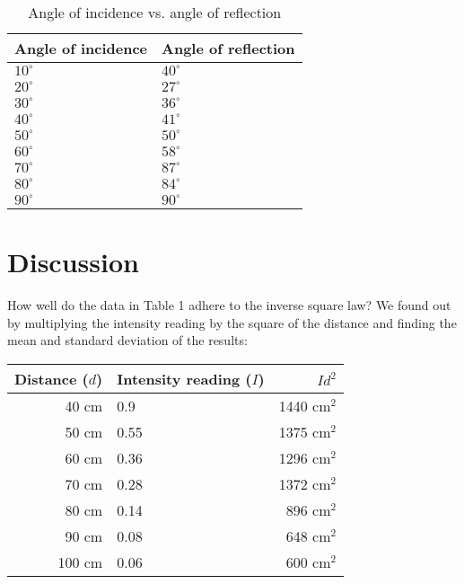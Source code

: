 \documentclass[11pt, titlepage, letterpaper, twoside]{article}
\begin{document}
\begin{table}[h!]
\centering
\caption{Angle of incidence vs. angle of reflection}
\label{angle-of-reflection}
\begin{tabular}{|l|l|}
\hline
Angle of incidence & Angle of reflection \\ \hline
$10^{\circ}$       & $40^{\circ}$        \\ \hline
$20^{\circ}$       & $27^{\circ}$        \\ \hline
$30^{\circ}$       & $36^{\circ}$        \\ \hline
$40^{\circ}$       & $41^{\circ}$        \\ \hline
$50^{\circ}$       & $50^{\circ}$        \\ \hline
$60^{\circ}$       & $58^{\circ}$        \\ \hline
$70^{\circ}$       & $87^{\circ}$        \\ \hline
$80^{\circ}$       & $84^{\circ}$        \\ \hline
$90^{\circ}$       & $90^{\circ}$        \\ \hline
\end{tabular}
\end{table}



\section{Discussion}

How well do the data in Table 1 adhere to the inverse square law? We found out by multiplying the
intensity reading by the square of the distance and finding the mean and standard deviation of
the results:

\begin{table}[h!]
\centering
\begin{tabular}{|r|l|r|}
\hline
Distance ($d$) & Intensity reading ($I$) & $Id^2$      \\ \hline
40 cm          & 0.9                     & 1440 cm$^2$ \\ \hline
50 cm          & 0.55                    & 1375 cm$^2$ \\ \hline
60 cm          & 0.36                    & 1296 cm$^2$ \\ \hline
70 cm          & 0.28                    & 1372 cm$^2$ \\ \hline
80 cm          & 0.14                    &  896 cm$^2$ \\ \hline
90 cm          & 0.08                    &  648 cm$^2$ \\ \hline
100 cm         & 0.06                    &  600 cm$^2$ \\ \hline
\end{tabular}
\end{table}
\end{document}
